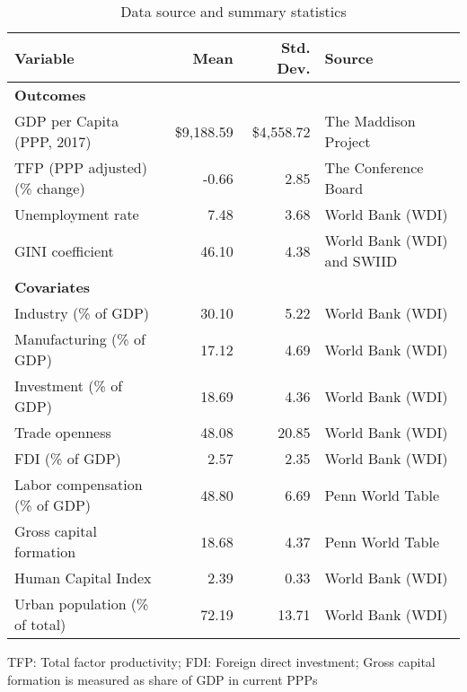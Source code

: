 \begin{table}[!h]
\begin{center}
\caption{Data source and summary statistics} \label{table:sources}
\begin{tabular}{l r r l} \\ \toprule
  Variable                       & Mean    & Std. Dev.     & Source                     \\ \midrule
  \textbf{Outcomes}              &         &               &                            \\
  GDP per Capita (PPP, 2017)     & \$9,188.59 & \$4,558.72 & The Maddison Project       \\
  TFP (PPP adjusted) (\% change) & -0.66   & 2.85          & The Conference Board       \\
  Unemployment rate              & 7.48    & 3.68          & World Bank (WDI)           \\
  GINI coefficient               & 46.10   & 4.38          & World Bank (WDI) and SWIID \\ \midrule
  \textbf{Covariates}            &         &               &                            \\
  Industry (\% of GDP)           & 30.10   & 5.22          & World Bank (WDI)           \\
  Manufacturing (\% of GDP)      & 17.12   & 4.69          & World Bank (WDI)           \\
  Investment (\% of GDP)         & 18.69   & 4.36          & World Bank (WDI)           \\
  Trade openness                 & 48.08   & 20.85         & World Bank (WDI)           \\
  FDI (\% of GDP)                & 2.57    & 2.35          & World Bank (WDI)           \\
  Labor compensation (\% of GDP) & 48.80   & 6.69          & Penn World Table           \\
  Gross capital formation        & 18.68   & 4.37          & Penn World Table           \\
  Human Capital Index            & 2.39    & 0.33          & World Bank (WDI)           \\
  Urban population (\% of total) & 72.19   & 13.71         & World Bank (WDI)           \\
  \bottomrule 
\end{tabular}
\singlespacing \footnotesize \raggedright
TFP: Total factor productivity; FDI: Foreign direct investment; Gross capital formation is measured as share of GDP in current PPPs
\end{center}
\end{table}